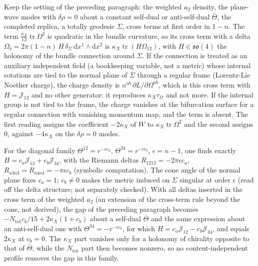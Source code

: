Keep the setting of the preceding paragraph: the weighted \(a_2\) density, the plane-wave modes with \(\delta\rho=0\) about a constant self-dual or anti-self-dual \(\bar\Theta\), the completed replica, a totally geodesic \(\Sigma\), cross terms at first order in \(1-n\). The term \(\tfrac{\kappa_X}{12}\operatorname{tr}\Omega^2\) is quadratic in the bundle curvature, so its cross term with a delta \(\Omega_\delta=2\pi(1-n)\,H\,\delta_\Sigma\,\mathrm dx^1\wedge\mathrm dx^2\) is \(\kappa_X\operatorname{tr}(H\Omega_{12})\), with \(H\in\mathfrak{so}(4)\) the holonomy of the bundle connection around \(\Sigma\). If the connection is treated as an auxiliary independent field (a bookkeeping variable, not a metric) whose internal rotations are tied to the normal plane of \(\Sigma\) through a regular frame (Lorentz-Lie Noether charge), the charge density is \(n^{ab}\,\partial L/\partial\Omega^{ab}\), which is this cross term with \(H=\mathcal J_{12}\) and no other generator: it reproduces \(\kappa_X\tau_\Omega\) and not more. If the internal group is not tied to the frame, the charge vanishes at the bifurcation surface for a regular connection with vanishing momentum map, and the term is absent. The first reading assigns the coefficient \(-2\kappa_X\) of \(W\) to \(\kappa_X\operatorname{tr}\Omega^2\) and the second assigns \(0\), against \(-4\kappa_X\) on the \(\delta\rho=0\) modes.



For the diagonal family \(\Theta^{12}=r^{-\epsilon c_a}\), \(\Theta^{34}=r^{-\epsilon c_b}\), \(\epsilon=n-1\), one finds exactly \(H=c_a\mathcal J_{12}+c_b\mathcal J_{34}\), with the Riemann deltas \(R_{1212}=-2\pi\epsilon c_a\), \(R_{a3a3}=R_{a4a4}=-\pi\epsilon c_b\) (symbolic computation). The cone angle of the normal plane fixes \(c_a=1\); \(c_b\neq0\) makes the metric induced on \(\Sigma\) singular at order \(\epsilon\) (read off the delta structure; not separately checked). With all deltas inserted in the cross term of the weighted \(a_2\) (an extension of the cross-term rule beyond the cone, not derived), the gap of the preceding paragraph becomes \(-N_{\mathrm{tot}}c_b/15+2\kappa_X(1+c_b)\) about a self-dual \(\bar\Theta\) and the same expression about an anti-self-dual one with \(\Theta^{34}=-r^{-\epsilon c_b}\), for which \(H=c_a\mathcal J_{12}-c_b\mathcal J_{34}\), and equals \(2\kappa_X\) at \(c_b=0\). The \(\kappa_X\) part vanishes only for a holonomy of chirality opposite to that of \(\bar\Theta\), while the \(N_{\mathrm{tot}}\) part then becomes nonzero, so no content-independent profile removes the gap in this family.



